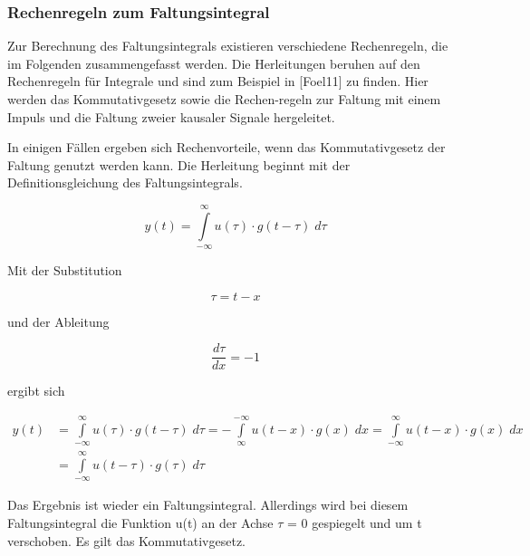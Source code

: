 \subsubsection{Rechenregeln zum Faltungsintegral}

\noindent Zur Berechnung des Faltungsintegrals existieren verschiedene Rechenregeln, die im Folgenden zusammengefasst werden. Die Herleitungen beruhen auf den Rechenregeln für Integrale und sind zum Beispiel in [Foel11] zu finden. Hier werden das Kommutativgesetz sowie die Rechen-regeln zur Faltung mit einem Impuls und die Faltung zweier kausaler Signale hergeleitet.\bigskip

\noindent\textbf{}

\noindent In einigen Fällen ergeben sich Rechenvorteile, wenn das Kommutativgesetz der Faltung genutzt werden kann. Die Herleitung beginnt mit der Definitionsgleichung des Faltungsintegrals.

\begin{equation}\label{eq:threehundredsixtyfive}
y\left(t\right)=\int\limits _{-\infty }^{\infty }u\left(\tau \right)\cdot g\left(t-\tau \right)\;d\tau
\end{equation}

\noindent Mit der Substitution

\begin{equation}\label{eq:threehundredsixtysix}
\tau =t-x
\end{equation}

\noindent und der Ableitung

\begin{equation}\label{eq:threehundredsixtyseven}
\frac{d\tau }{dx} =-1
\end{equation}

\noindent ergibt sich 

\begin{equation}\label{eq:threehundredsixtyeight}
\begin{split}
y\left(t\right) & = \int\limits _{-\infty }^{\infty }u\left(\tau \right)\cdot g\left(t-\tau \right)\;d\tau  =-\int\limits _{\infty }^{-\infty }u\left(t-x\right)\cdot g\left(x\right)\;dx =\int\limits _{-\infty }^{\infty }u\left(t-x\right)\cdot g\left(x\right)\;dx \\
& = \int\limits _{-\infty }^{\infty } u\left(t-\tau\right)\cdot g(\tau) \; d\tau
\end{split}
\end{equation}

\noindent Das Ergebnis ist wieder ein Faltungsintegral. Allerdings wird bei diesem Faltungsintegral die Funktion u(t) an der Achse $\tau$ = 0 gespiegelt und um t verschoben. Es gilt das Kommutativgesetz.

